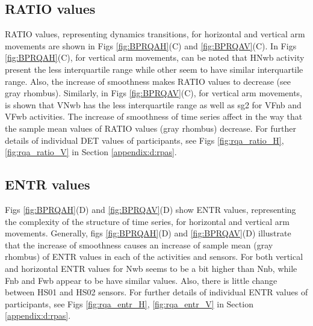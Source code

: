 \subsection*{RATIO values}
RATIO values, representing dynamics transitions, for horizontal and 
vertical arm movements are shown in Figs 
\ref{fig:BPRQAH}(C) and \ref{fig:BPRQAV}(C).
In Figs \ref{fig:BPRQAH}(C), for vertical arm movements, 
can be noted that HNwb activity
present the less interquartile range while other seem to have similar
interquartile range. Also, the increase of smoothness makes RATIO
values to decrease (see gray rhombus).
Similarly, in Figs \ref{fig:BPRQAV}(C), for vertical arm movements, 
is shown that VNwb has the less interquartile range as well as 
sg2 for VFnb and VFwb activities. 
The increase of smoothness of time series affect in the way that 
the sample mean values of RATIO values (gray rhombus) decrease. 
For further details of individual DET values of participants, see 
Figs \ref{fig:rqa_ratio_H}, \ref{fig:rqa_ratio_V} in
Section \ref{appendix:d:rpas}.

\subsection*{ENTR values}
Figs \ref{fig:BPRQAH}(D) and \ref{fig:BPRQAV}(D) show ENTR values, 
representing the complexity of the structure of time series, 
for horizontal and vertical arm movements.
Generally, figs \ref{fig:BPRQAH}(D) and \ref{fig:BPRQAV}(D) 
illustrate that the increase of smoothness causes an increase of 
sample mean (gray rhombus) of ENTR values in each of 
the activities and sensors. 
For both vertical and horizontal ENTR values for Nwb seems 
to be a bit higher than Nnb, while Fnb and Fwb appear to be 
have similar values.
Also, there is little change between HS01 and HS02 sensors.
For further details of individual ENTR values of participants, see 
Figs \ref{fig:rqa_entr_H}, \ref{fig:rqa_entr_V} in
Section \ref{appendix:d:rpas}.

